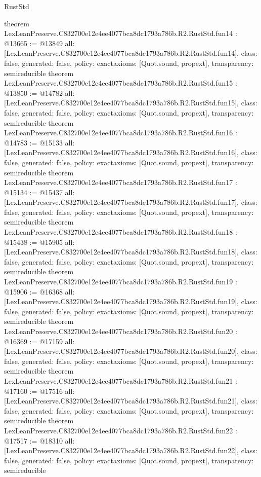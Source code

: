 \begin{lexlean}{RustStd}
\begin{coremodule}
{}
theorem LexLeanPreserve.C832700e12e4ee4077bca8dc1793a786b.R2.RustStd.fun14 : @13665 := @13849 {
  all: [LexLeanPreserve.C832700e12e4ee4077bca8dc1793a786b.R2.RustStd.fun14],
  class: false,
  generated: false,
  policy: exact{axioms: [Quot.sound, propext]},
  transparency: semireducible
}
theorem LexLeanPreserve.C832700e12e4ee4077bca8dc1793a786b.R2.RustStd.fun15 : @13850 := @14782 {
  all: [LexLeanPreserve.C832700e12e4ee4077bca8dc1793a786b.R2.RustStd.fun15],
  class: false,
  generated: false,
  policy: exact{axioms: [Quot.sound, propext]},
  transparency: semireducible
}
theorem LexLeanPreserve.C832700e12e4ee4077bca8dc1793a786b.R2.RustStd.fun16 : @14783 := @15133 {
  all: [LexLeanPreserve.C832700e12e4ee4077bca8dc1793a786b.R2.RustStd.fun16],
  class: false,
  generated: false,
  policy: exact{axioms: [Quot.sound, propext]},
  transparency: semireducible
}
theorem LexLeanPreserve.C832700e12e4ee4077bca8dc1793a786b.R2.RustStd.fun17 : @15134 := @15437 {
  all: [LexLeanPreserve.C832700e12e4ee4077bca8dc1793a786b.R2.RustStd.fun17],
  class: false,
  generated: false,
  policy: exact{axioms: [Quot.sound, propext]},
  transparency: semireducible
}
theorem LexLeanPreserve.C832700e12e4ee4077bca8dc1793a786b.R2.RustStd.fun18 : @15438 := @15905 {
  all: [LexLeanPreserve.C832700e12e4ee4077bca8dc1793a786b.R2.RustStd.fun18],
  class: false,
  generated: false,
  policy: exact{axioms: [Quot.sound, propext]},
  transparency: semireducible
}
theorem LexLeanPreserve.C832700e12e4ee4077bca8dc1793a786b.R2.RustStd.fun19 : @15906 := @16368 {
  all: [LexLeanPreserve.C832700e12e4ee4077bca8dc1793a786b.R2.RustStd.fun19],
  class: false,
  generated: false,
  policy: exact{axioms: [Quot.sound, propext]},
  transparency: semireducible
}
theorem LexLeanPreserve.C832700e12e4ee4077bca8dc1793a786b.R2.RustStd.fun20 : @16369 := @17159 {
  all: [LexLeanPreserve.C832700e12e4ee4077bca8dc1793a786b.R2.RustStd.fun20],
  class: false,
  generated: false,
  policy: exact{axioms: [Quot.sound, propext]},
  transparency: semireducible
}
theorem LexLeanPreserve.C832700e12e4ee4077bca8dc1793a786b.R2.RustStd.fun21 : @17160 := @17516 {
  all: [LexLeanPreserve.C832700e12e4ee4077bca8dc1793a786b.R2.RustStd.fun21],
  class: false,
  generated: false,
  policy: exact{axioms: [Quot.sound, propext]},
  transparency: semireducible
}
theorem LexLeanPreserve.C832700e12e4ee4077bca8dc1793a786b.R2.RustStd.fun22 : @17517 := @18310 {
  all: [LexLeanPreserve.C832700e12e4ee4077bca8dc1793a786b.R2.RustStd.fun22],
  class: false,
  generated: false,
  policy: exact{axioms: [Quot.sound, propext]},
  transparency: semireducible
}
\end{coremodule}
\end{lexlean}
